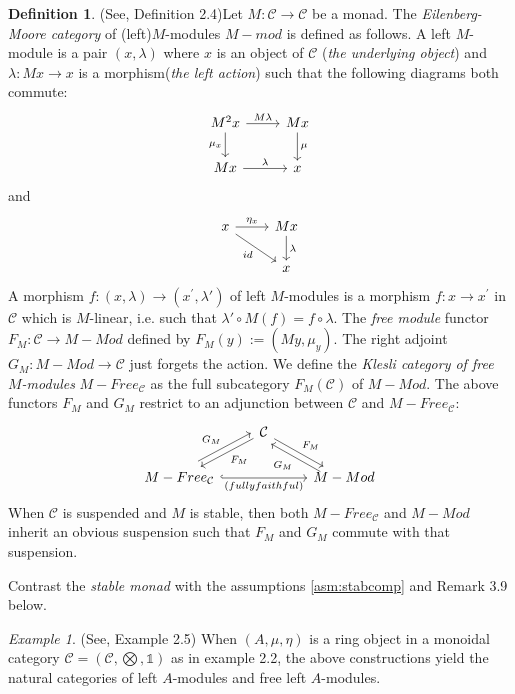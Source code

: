 \documentclass{article}
\newcommand{\cC}{\mathcal{C}}
\theoremstyle{definition}
\newtheorem{definition}[theorem]{Definition}
\theoremstyle{remark}
\newtheorem{example}[theorem]{Example}
\begin{document}
\begin{definition}(See, \cite{balmer:septrcat} Definition 2.4)\label{def:M-mod} Let $M:\cC \rightarrow \cC$ be a monad. The \textit{Eilenberg-Moore category} of (left)$M$-modules $M-mod$ is defined as follows. A left $M$-module is a pair $(x, \lambda)$ where $x$ is an object of $\cC$ (\textit{the underlying object}) and $\lambda:Mx \rightarrow x$ is a morphism(\textit{the left action}) such that the following diagrams both commute:
\[\begin{tikzcd}
M^{2}x \arrow{r}{M\lambda} \arrow[swap]{d}{\mu_{x}} & Mx \arrow{d}{\mu} \\
Mx \arrow{r}{\lambda} & x
\end{tikzcd}
\] and 
\[\begin{tikzcd}
x \arrow{r}{\eta_{x}} \arrow[swap]{dr}{id} & Mx \arrow{d}{\lambda} \\
& x
\end{tikzcd}
\]
A morphism $f: (x,\lambda) \rightarrow (x^{'}, \lambda')$ of left $M$-modules is a morphism $f: x \rightarrow x^{'}$ in $\cC$ which is $M$-linear, i.e. such that $\lambda'\circ M(f)=f \circ \lambda$. The \textit{free module} functor $F_{M}: \cC \rightarrow M-Mod$ defined by $F_{M}(y):=(My,\mu_{y})$. The right adjoint $G_{M}:M-Mod \rightarrow \cC$ just forgets the action. We define the \textit{Klesli category of free $M$-modules} $M-Free_{\mathcal{C}}$ as the full subcategory $F_{M}(\cC)$ of  $M-Mod$. The above functors $F_{M}$ and $G_{M}$ restrict to an adjunction between $\cC$ and $M-Free_{\cC}$: \[\begin{tikzcd}
 & \cC \arrow[dl,"F_{M}"] \arrow[dr,"F_{M}"]  \\
 M-Free_{\cC} \arrow[hookrightarrow, rr,"(fully faithful)"below] \arrow[ur,"G_{M}",shift left=1ex] && M-Mod \arrow[ul, "G_{M}",shift left=1ex] 
\end{tikzcd}
\]
When $\mathcal{C}$ is suspended and $M$ is stable, then both $M-Free_{\mathcal{C}}$ and $M-Mod$ inherit an obvious suspension such that $F_{M}$ and $G_{M}$ commute with that suspension.

\end{definition}
Contrast the \textit{stable monad} with the  assumptions \ref{asm:stabcomp} and Remark 3.9 below.
\begin{example}
    (See, \cite{balmer:septrcat} Example 2.5) When $(A,\mu,\eta)$ is a ring object in a monoidal category $\cC=(\cC, \bigotimes,\mathbb{1})$ as in example 2.2, the above constructions yield the natural categories of left $A$-modules and free left $A$-modules.
\end{example}
\end{document}
